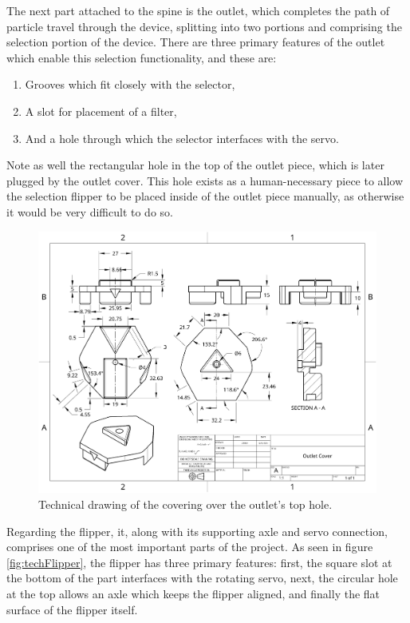 \documentclass[fleqn,10pt]{SelfArx} %
\begin{document}
			The next part attached to the spine is the outlet, which completes the path of particle travel through the device, splitting into two portions and comprising the selection portion of the device. There are three primary features of the outlet which enable this selection functionality, and these are: 
		\begin{enumerate}
			\item Grooves which fit closely with the selector,
			\item A slot for placement of a filter,
			\item And a hole through which the selector interfaces with the servo.
		\end{enumerate}
		Note as well the rectangular hole in the top of the outlet piece, which is later plugged by the outlet cover. This hole exists as a human-necessary piece to allow the selection flipper to be placed inside of the outlet piece manually, as otherwise it would be very difficult to do so.			
		\begin{figure}[h]
			\centering
			\includegraphics[width=1\linewidth]{Figures/TechCover}
			\caption[Outlet Covering Tech. Drawing]{Technical drawing of the covering over the outlet's top hole.}
			\label{fig:techCover}
		\end{figure} 
		Regarding the flipper, it, along with its supporting axle and servo connection, comprises one of the most important parts of the project. As seen in figure \ref{fig:techFlipper}, the flipper has three primary features: first, the square slot at the bottom of the part interfaces with the rotating servo, next, the circular hole at the top allows an axle which keeps the flipper aligned, and finally the flat surface of the flipper itself. 
\end{document}

